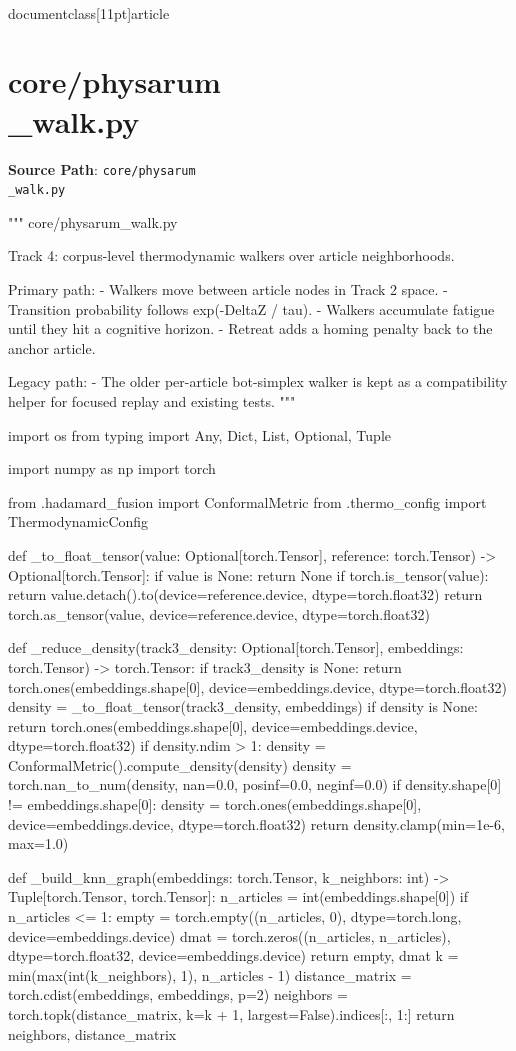 \\documentclass[11pt]{article}
\begin{document}
\section*{core/physarum\\_walk.py}
\textbf{Source Path}: \texttt{core/physarum\\_walk.py}\par
\bigskip
\begin{CodeBlock}
"""
core/physarum_walk.py

Track 4: corpus-level thermodynamic walkers over article neighborhoods.

Primary path:
- Walkers move between article nodes in Track 2 space.
- Transition probability follows exp(-DeltaZ / tau).
- Walkers accumulate fatigue until they hit a cognitive horizon.
- Retreat adds a homing penalty back to the anchor article.

Legacy path:
- The older per-article bot-simplex walker is kept as a compatibility
  helper for focused replay and existing tests.
"""

import os
from typing import Any, Dict, List, Optional, Tuple

import numpy as np
import torch

from .hadamard_fusion import ConformalMetric
from .thermo_config import ThermodynamicConfig

def _to_float_tensor(value: Optional[torch.Tensor], reference: torch.Tensor) -> Optional[torch.Tensor]:
    if value is None:
        return None
    if torch.is_tensor(value):
        return value.detach().to(device=reference.device, dtype=torch.float32)
    return torch.as_tensor(value, device=reference.device, dtype=torch.float32)


def _reduce_density(track3_density: Optional[torch.Tensor], embeddings: torch.Tensor) -> torch.Tensor:
    if track3_density is None:
        return torch.ones(embeddings.shape[0], device=embeddings.device, dtype=torch.float32)
    density = _to_float_tensor(track3_density, embeddings)
    if density is None:
        return torch.ones(embeddings.shape[0], device=embeddings.device, dtype=torch.float32)
    if density.ndim > 1:
        density = ConformalMetric().compute_density(density)
    density = torch.nan_to_num(density, nan=0.0, posinf=0.0, neginf=0.0)
    if density.shape[0] != embeddings.shape[0]:
        density = torch.ones(embeddings.shape[0], device=embeddings.device, dtype=torch.float32)
    return density.clamp(min=1e-6, max=1.0)


def _build_knn_graph(embeddings: torch.Tensor, k_neighbors: int) -> Tuple[torch.Tensor, torch.Tensor]:
    n_articles = int(embeddings.shape[0])
    if n_articles <= 1:
        empty = torch.empty((n_articles, 0), dtype=torch.long, device=embeddings.device)
        dmat = torch.zeros((n_articles, n_articles), dtype=torch.float32, device=embeddings.device)
        return empty, dmat
    k = min(max(int(k_neighbors), 1), n_articles - 1)
    distance_matrix = torch.cdist(embeddings, embeddings, p=2)
    neighbors = torch.topk(distance_matrix, k=k + 1, largest=False).indices[:, 1:]
    return neighbors, distance_matrix



\end{CodeBlock}
\end{document}
